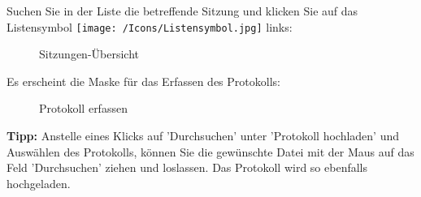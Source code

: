 \pagebreak

Suchen Sie in der Liste die betreffende Sitzung und klicken Sie auf das Listensymbol \texttt{[image: /Icons/Listensymbol.jpg]}  links:

\begin{figure}[H]
\caption{Sitzungen-Übersicht}
\end{figure}

\vspace{\baselineskip}

Es erscheint die Maske für das Erfassen des Protokolls:

\begin{figure}[H]
\caption{Protokoll erfassen}
\end{figure}

\textbf{Tipp:} Anstelle eines Klicks auf 'Durchsuchen' unter 'Protokoll hochladen' und Auswählen des Protokolls, können Sie die gewünschte Datei mit der Maus auf das Feld 'Durchsuchen' ziehen und loslassen. Das Protokoll wird so ebenfalls hochgeladen.

\vspace{\baselineskip}

